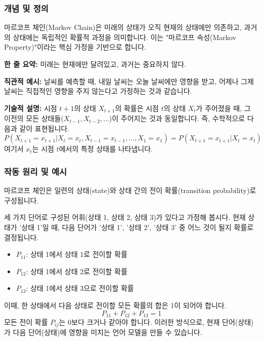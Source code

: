 \documentclass[11pt,a4paper]{article}
\begin{document}
\subsubsection{개념 및 정의}
마르코프 체인(Markov Chain)은 미래의 상태가 오직 현재의 상태에만 의존하고, 과거의 상태에는 독립적인 확률적 과정을 의미합니다. 이는 "마르코프 속성(Markov Property)"이라는 핵심 가정을 기반으로 합니다.

\begin{tcolorbox}[conceptbox, title=마르코프 속성 (Markov Property)]
\textbf{한 줄 요약:} 미래는 현재에만 달려있고, 과거는 중요하지 않다.

\textbf{직관적 예시:} 날씨를 예측할 때, 내일 날씨는 오늘 날씨에만 영향을 받고, 어제나 그제 날씨는 직접적인 영향을 주지 않는다고 가정하는 것과 같습니다.

\textbf{기술적 설명:} 시점 $t+1$의 상태 $X_{t+1}$의 확률은 시점 $t$의 상태 $X_t$가 주어졌을 때, 그 이전의 모든 상태들($X_{t-1}, X_{t-2}, \dots$)이 주어지는 것과 동일합니다. 즉, 수학적으로 다음과 같이 표현됩니다.
\[ P(X_{t+1} = x_{t+1} | X_t = x_t, X_{t-1} = x_{t-1}, \dots, X_1 = x_1) = P(X_{t+1} = x_{t+1} | X_t = x_t) \]
여기서 $x_t$는 시점 $t$에서의 특정 상태를 나타냅니다.
\end{tcolorbox}

\subsubsection{작동 원리 및 예시}
마르코프 체인은 일련의 상태(state)와 상태 간의 전이 확률(transition probability)로 구성됩니다.

\begin{examplebox}[title=마르코프 체인 예시: 간단한 어휘 모델]
세 가지 단어로 구성된 어휘(상태 1, 상태 2, 상태 3)가 있다고 가정해 봅시다.
현재 상태가 '상태 1'일 때, 다음 단어가 '상태 1', '상태 2', '상태 3' 중 어느 것이 될지 확률로 결정됩니다.

\begin{itemize}
    \item $P_{11}$: 상태 1에서 상태 1로 전이할 확률
    \item $P_{12}$: 상태 1에서 상태 2로 전이할 확률
    \item $P_{13}$: 상태 1에서 상태 3으로 전이할 확률
\end{itemize}
이때, 한 상태에서 다음 상태로 전이할 모든 확률의 합은 1이 되어야 합니다.
\[ P_{11} + P_{12} + P_{13} = 1 \]
모든 전이 확률 $P_{ij}$는 0보다 크거나 같아야 합니다.
이러한 방식으로, 현재 단어(상태)가 다음 단어(상태)에 영향을 미치는 언어 모델을 만들 수 있습니다.
\end{examplebox}
\end{document}
